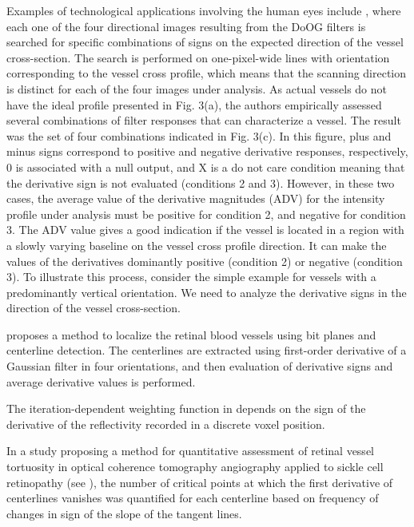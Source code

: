 \documentclass[11pt]{book}
\begin{document}
Examples of technological applications involving the human eyes include \cite{mendonca2006segmentation}, where each one of the four directional images resulting from
the DoOG filters is searched for
specific combinations of signs on the expected direction of the vessel
cross-section. The search is performed on one-pixel-wide lines with
orientation corresponding to the vessel cross profile, which means
that the scanning direction is distinct for each of the four images
under analysis. As actual vessels do not have the ideal profile presented
in Fig. 3(a), the authors empirically assessed several combinations
of filter responses that can characterize a vessel. The result was
the set of four combinations indicated in Fig. 3(c). In this figure,
plus and minus signs correspond to positive and negative derivative
responses, respectively, 0 is associated with a null output, and X
is a do not care condition meaning that the derivative sign is not
evaluated (conditions 2 and 3). However, in these two cases, the average
value of the derivative magnitudes (ADV) for the intensity profile
under analysis must be positive for condition 2, and negative for
condition 3. The ADV value gives a good indication if the vessel is
located in a region with a slowly varying baseline on the vessel cross
profile direction. It can make the values of the derivatives dominantly
positive (condition 2) or negative (condition 3). To illustrate this
process, consider the simple example for vessels with a predominantly
vertical orientation. We need to analyze the derivative signs in the
direction of the vessel cross-section. 

\cite{fraz2012approach} proposes a method to localize the retinal blood vessels using
bit planes and centerline detection. The centerlines are extracted using first-order derivative of a Gaussian
filter in four orientations, and then evaluation of derivative signs
and average derivative values is performed.  

The iteration-dependent weighting function in \cite{de2017automated} depends on the sign
of the derivative of the reflectivity recorded in a discrete voxel
position.

In a study proposing a method for quantitative assessment of retinal vessel tortuosity
in optical coherence tomography angiography applied to sickle cell retinopathy (see \cite{khansari2017method}), the number of critical points at which the first
derivative of centerlines vanishes was quantified
for each centerline based on frequency of changes in sign of the slope
of the tangent lines. 
\end{document}
